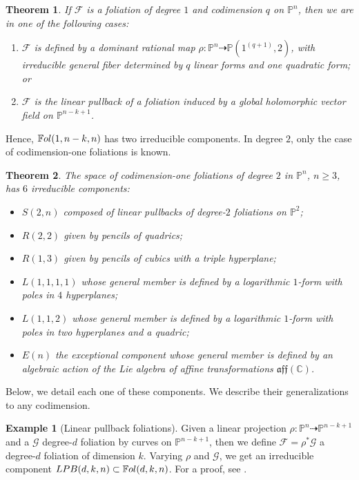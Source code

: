 \documentclass[twoside]{amsart}
\numberwithin{equation}{section}
\newcommand{\p}[1]{{\mathbb{P}^{#1}}}
\newcommand{\pn}{{\mathbb{P}^{n}}}
\def\PP{{\mathbb{P}}}
\def\CC{{\mathbb{C}}}
\newcommand{\sF}{\mathscr{F}}
\newcommand{\sG}{\mathscr{G}}
\newcommand{\Fol}{\mathbb{F}{\rm ol}}
\newcommand{\lpb}[3]{{\rm LPB }(#1,#2,#3)}
\newtheorem{theorem}{Theorem}[section]
\theoremstyle{definition}
\newtheorem{example}{Example}[section]
\begin{document}
\begin{theorem}\cite[ Theorem 6.2]{LPT2}\label{thm:fols-deg1}
If $\sF$ is a foliation of degree $1$ and codimension $q$ on $\pn$, then we are in one of the following cases:
\begin{enumerate}
\item $\sF$ is defined by a dominant rational map $\rho \colon \pn \dashrightarrow \PP(1^{(q+1)},2)$, with irreducible general fiber determined by $q$ linear forms and one quadratic form; or
\item $\sF$ is the linear pullback of a foliation induced by a global holomorphic vector field on  $\mathbb{P}^{n-k+1}$. 
\end{enumerate}
\end{theorem}
Hence, $\Fol(1,n-k,n)$ has two irreducible components. In degree $2$, only the case of codimension-one foliations is known. 

\begin{theorem}\cite[Theorem A]{CLN}
The space of codimension-one foliations of degree $2$ in $\pn$, $n\geq 3$, has $6$ irreducible components: 
\begin{itemize}
    \item ${S(2,n)}$ composed of linear pullbacks of degree-$2$ foliations on $\p2$;
    \item ${R(2,2)}$ given by pencils of quadrics;
    \item ${R(1,3)}$ given by pencils of cubics with a triple hyperplane;
    \item ${L(1,1,1,1)}$ whose general member is defined by a logarithmic $1$-form with poles in $4$ hyperplanes;
    \item ${L(1,1,2)}$ whose general member is defined by a logarithmic $1$-form with poles in two hyperplanes and a quadric;
    \item ${E(n)}$ the \emph{exceptional component} whose general member is defined by an algebraic action of the Lie algebra of affine transformations $\mathfrak{aff}(\CC)$.
\end{itemize}
\end{theorem}

Below, we detail each one of these components. We describe their generalizations to any codimension. 

\begin{example}[Linear pullback foliations]\label{ex:lpb-fols}
Given a linear projection $\rho \colon \pn \dashrightarrow \p{n-k+1}$ and a $\sG$ degree-$d$ foliation by curves on $\p{n-k+1}$, then we define $\sF = \rho^*\sG$ a degree-$d$ foliation of dimension $k$. Varying $\rho$ and $\sG$, we get an irreducible component $\lpb{d}{k}{n} \subset \Fol(d,k,n)$. For a proof, see \cite[Corollary 5.1]{CP1}.
\end{example}
\end{document}
